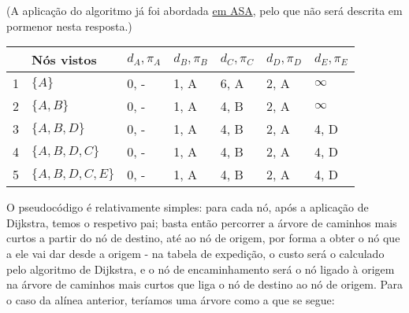 
\begin{enumerate}[leftmargin=\labelsep]

        (A aplicação do algoritmo já foi abordada \href{https://resumos.leic.pt/asa/caminhos-mais-curtos/#algoritmo-de-dijkstra}{em ASA}, pelo que
        não será descrita em pormenor nesta resposta.)

        \begin{table}[H]
          \centering
          \begin{tabular}{l|l|l|l|l|l|l}
              & Nós vistos          & $d_A, \pi_A$ & $d_B, \pi_B$ & $d_C, \pi_C$ & $d_D, \pi_D$ & $d_E, \pi_E$ \\ \hline
            1 & $\{A\}$             & 0, -         & 1, A         & 6, A         & 2, A         & $\infty$     \\
            2 & $\{A, B\}$          & 0, -         & 1, A         & 4, B         & 2, A         & $\infty$     \\
            3 & $\{A, B, D\}$       & 0, -         & 1, A         & 4, B         & 2, A         & 4, D         \\
            4 & $\{A, B, D, C\}$    & 0, -         & 1, A         & 4, B         & 2, A         & 4, D         \\
            5 & $\{A, B, D, C, E\}$ & 0, -         & 1, A         & 4, B         & 2, A         & 4, D
          \end{tabular}
        \end{table}


        O pseudocódigo é relativamente simples: para cada nó, após a aplicação de
        Dijkstra, temos o respetivo pai; basta então percorrer a árvore de caminhos
        mais curtos a partir do nó de destino, até ao nó de origem, por forma a
        obter o nó que a ele vai dar desde a origem - na tabela de expedição, o
        custo será o calculado pelo algoritmo de Dijkstra, e o nó de encaminhamento
        será o nó ligado à origem na árvore de caminhos mais curtos que liga o
        nó de destino ao nó de origem. Para o caso da alínea anterior, teríamos
        uma árvore como a que se segue:


\end{enumerate}
